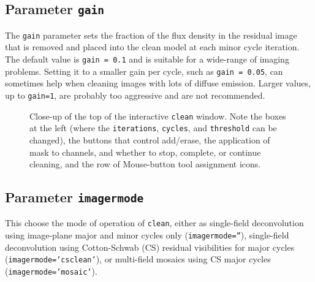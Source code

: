 \subsection{Parameter {\tt gain} }
\label{section:im.clean.gain}

The {\tt gain} parameter sets the fraction of the flux density in
the residual image that is removed and placed into the clean model
at each minor cycle iteration.  The default value is {\tt gain = 0.1}
and is suitable for a wide-range of imaging problems.  Setting it to
a smaller gain per cycle, such as {\tt gain = 0.05}, can sometimes 
help when cleaning images with lots of diffuse emission.  Larger values,
up to {\tt gain=1}, are probably too aggressive and are not recommended.

\begin{figure}[h!]
\begin{center}
\caption{\label{fig:clean_inter_control} Close-up of the top of the 
interactive {\tt clean} window.  Note the boxes at the left
(where the {\tt iterations}, {\tt cycles}, and {\tt threshold} can
be changed), the buttons that control add/erase, the application
of mask to channels, and whether to stop, complete, or continue
cleaning, and the row of Mouse-button tool assignment icons.} 
\hrulefill
\end{center}
\end{figure}

\subsection{Parameter {\tt imagermode} }
\label{section:im.clean.imagermode}

This choose the mode of operation of {\tt clean}, either as
single-field deconvolution using image-plane major and minor
cycles only ({\tt imagermode=''}), single-field deconvolution
using Cotton-Schwab (CS) residual visibilities for major cycles
({\tt imagermode='csclean'}), or multi-field mosaics using CS
major cycles ({\tt imagermode='mosaic'}).




